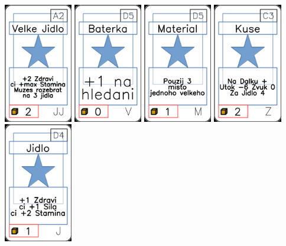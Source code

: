 \documentclass[a4paper]{article}
\begin{document}
	\includegraphics[width=3.0cm]{img-1_31}
	\includegraphics[width=3.0cm]{img-1_79}
	\includegraphics[width=3.0cm]{img-1_49}
	\includegraphics[width=3.0cm]{img-1_102}
	\includegraphics[width=3.0cm]{img-1_18}
\end{document}
